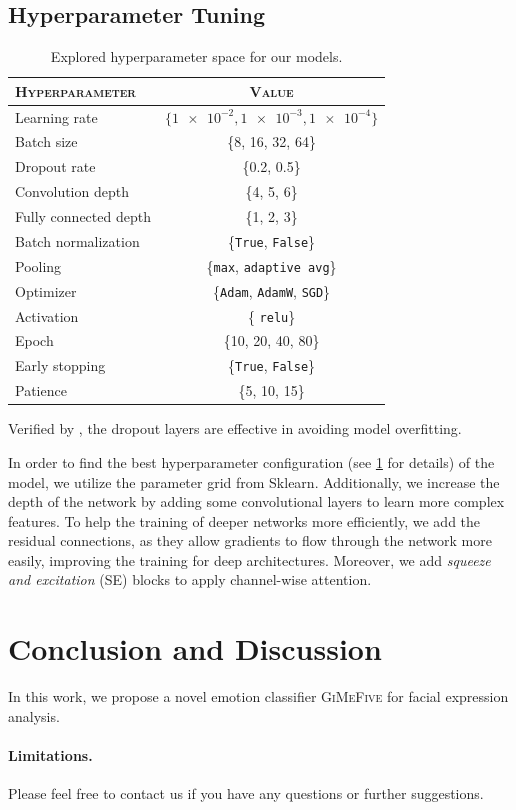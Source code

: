 \subsection{Hyperparameter Tuning}
\label{sec:optim:tuning}

\begin{table}[ht]
  \centering
  \begin{tabular}{@{}lc@{}}
    \toprule
    \textsc{Hyperparameter} & \textsc{Value} \\
    \midrule
    Learning rate & $ \{\num{1e-2}, \num{1e-3}, \num{1e-4} \} $ \\
    Batch size & \{8, 16, 32, 64\} \\
    Dropout rate & \{0.2, 0.5\} \\
    Convolution depth & \{4, 5, 6\} \\
    Fully connected depth & \{1, 2, 3\} \\
    Batch normalization & \{\texttt{True}, \texttt{False}\} \\
    Pooling & \{\texttt{max}, \texttt{adaptive avg}\} \\
    Optimizer & \{\texttt{Adam}, \texttt{AdamW}, \texttt{SGD}\} \\
    Activation & \{ \texttt{relu}\} \\ %
    Epoch & \{10, 20, 40, 80\} \\
    Early stopping & \{\texttt{True}, \texttt{False}\} \\
    Patience & \{5, 10, 15\} \\
    \bottomrule
  \end{tabular}
  \caption{Explored hyperparameter space for our models.}
  \label{tab:hyper}
\end{table}

Verified by \citet{BarsoumZCZ16}, 
the dropout layers are effective in avoiding model overfitting. 

In order to find the best hyperparameter configuration (see \cref{tab:hyper} for details) of the model, 
we utilize the parameter grid from Sklearn.
Additionally, 
we increase the depth of the network by adding some convolutional layers to learn more complex features. 
To help the training of deeper networks more efficiently, 
we add the residual connections, 
as they allow gradients to flow through the network more easily, 
improving the training for deep architectures. 
Moreover, 
we add \textit{squeeze and excitation} (SE) blocks to apply channel-wise attention. 

\section{Conclusion and Discussion}
\label{sec:conclusion}

In this work, we propose a novel emotion classifier \textsc{GiMeFive} for facial expression analysis. 


\paragraph{Limitations.}

Please feel free to contact us if you have any questions or further suggestions.

\newpage
